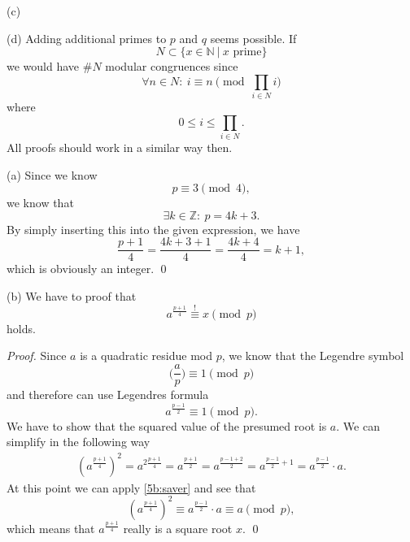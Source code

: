 \documentclass[12pt]{article}
\begin{document}
 (c)
 
 (d) Adding additional primes to $p$ and $q$ seems possible. If \begin{equation}
 	N\subset\{x\in\mathbb{N}\ |\ x\textrm{ prime}\}
 \end{equation} we would have $\#N$ modular congruences since \begin{equation}
 	\forall n\in N:\ i\equiv n \pmod{\prod_{i\in N} i}
 \end{equation} where \begin{equation}
 	0\leq i\leq \prod_{i\in N}.
 \end{equation} All proofs should work in a similar way then.
 
 \noindent (a) Since we know \begin{equation}
 	p \equiv 3 \pmod{4},
 \end{equation} we know that \begin{equation} \label{task5:modp}
 	\exists k\in\mathbb{Z}:\ p=4k+3.
 \end{equation} By simply inserting this into the given expression, we have \begin{equation}
 	\frac{p+1}{4} = \frac{4k+3+1}{4} = \frac{4k+4}{4}=k+1, \label{5a:kp1}
 \end{equation} which is obviously an integer. \qed
 
 \noindent (b) We have to proof that \begin{equation}
 	a^{\frac{p+1}{4}}\overset{!}{\equiv}x \pmod{p}
 \end{equation} holds.
 

 \textit{Proof.} Since $a$ is a quadratic residue mod $p$, we know that the Legendre symbol \begin{equation}
 	\bigg(\frac{a}{p}\bigg)\equiv 1\pmod{p}
 \end{equation} and therefore can use Legendres formula \begin{equation}
 	a^{\frac{p-1}{2}}\equiv 1\pmod{p}. \label{5b:saver}
 \end{equation} We have to show that the squared value of the presumed root is $a$. We can simplify in the following way \begin{gather}
 	(a^{\frac{p+1}{4}})^2=a^{2\frac{p+1}{4}}=a^{\frac{p+1}{2}}=a^{\frac{p-1+2}{2}}=a^{\frac{p-1}{2}+1}=a^{\frac{p-1}{2}}\cdot a.
 \end{gather} At this point we can apply \autoref{5b:saver} and see that \begin{equation}
 	(a^{\frac{p+1}{4}})^2\equiv a^{\frac{p-1}{2}}\cdot a\equiv a\pmod{p},
 \end{equation}
 which means that $a^{\frac{p+1}{4}}$ really is a square root $x$. \qed
 
\end{document}
